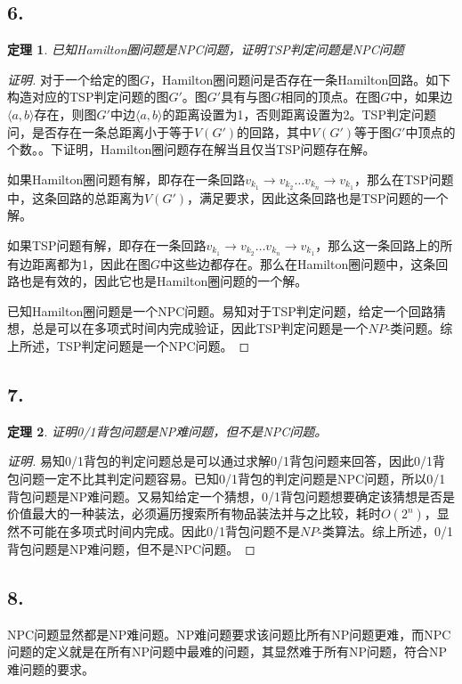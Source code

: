 \documentclass[a4paper]{article}
\newtheorem{theorem}{定理}
\begin{document}
\subsection*{6.}
\begin{theorem}
  已知Hamilton圈问题是NPC问题，证明TSP判定问题是NPC问题
\end{theorem}
\begin{proof}[证明]
  对于一个给定的图$G$，Hamilton圈问题问是否存在一条Hamilton回路。如下构造对应的TSP判定问题的图$G'$。图$G'$具有与图$G$相同的顶点。在图$G$中，如果边$\langle a, b \rangle$存在，则图$G'$中边$\langle a, b \rangle$的距离设置为1，否则距离设置为2。TSP判定问题问，是否存在一条总距离小于等于$V(G')$的回路，其中$V(G')$等于图$G'$中顶点的个数。。下证明，Hamilton圈问题存在解当且仅当TSP问题存在解。

  如果Hamilton圈问题有解，即存在一条回路$v_{k_1} \rightarrow v_{k_2} \dots v_{k_n} \rightarrow v_{k_1}$，那么在TSP问题中，这条回路的总距离为$V(G')$，满足要求，因此这条回路也是TSP问题的一个解。

  如果TSP问题有解，即存在一条回路$v_{k_1} \rightarrow v_{k_2} \dots v_{k_n} \rightarrow v_{k_1}$，那么这一条回路上的所有边距离都为1，因此在图$G$中这些边都存在。那么在Hamilton圈问题中，这条回路也是有效的，因此它也是Hamilton圈问题的一个解。

  已知Hamilton圈问题是一个NPC问题。易知对于TSP判定问题，给定一个回路猜想，总是可以在多项式时间内完成验证，因此TSP判定问题是一个$NP$-类问题。综上所述，TSP判定问题是一个NPC问题。
\end{proof}

\subsection*{7.}
\begin{theorem}
  证明0/1背包问题是NP难问题，但不是NPC问题。
\end{theorem}
\begin{proof}[证明]
  易知0/1背包的判定问题总是可以通过求解0/1背包问题来回答，因此0/1背包问题一定不比其判定问题容易。已知0/1背包的判定问题是NPC问题，所以0/1背包问题是NP难问题。又易知给定一个猜想，0/1背包问题想要确定该猜想是否是价值最大的一种装法，必须遍历搜索所有物品装法并与之比较，耗时$O(2^n)$，显然不可能在多项式时间内完成。因此0/1背包问题不是$NP$-类算法。综上所述，0/1背包问题是NP难问题，但不是NPC问题。
\end{proof}

\subsection*{8.}
NPC问题显然都是NP难问题。NP难问题要求该问题比所有NP问题更难，而NPC问题的定义就是在所有NP问题中最难的问题，其显然难于所有NP问题，符合NP难问题的要求。
\end{document}
